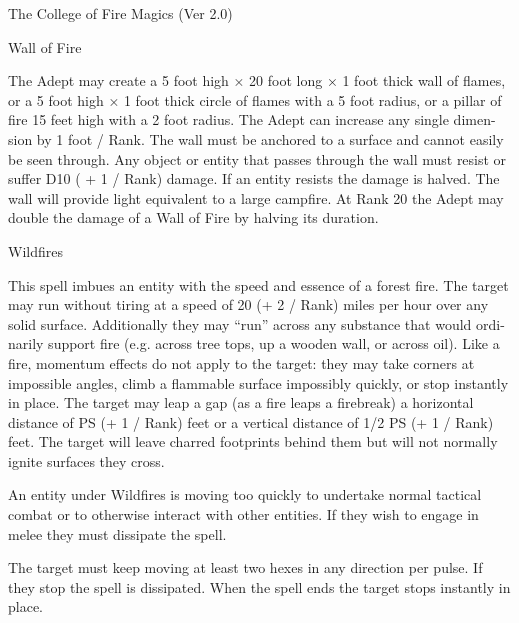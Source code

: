 \begin{Chapter}{The College of Fire Magics (Ver 2.0)}
\begin{spell}[S-13]{Wall of Fire }
\begin{effects}
 The  Adept  may  create  a  5  foot  high  ×  20 
foot long × 1 foot thick wall of flames, or a 5 foot 
high  ×  1  foot  thick  circle  of  flames  with  a  5  foot 
radius, or a pillar of fire 15 feet high with a 2 foot 
radius.  The  Adept  can  increase  any  single  dimen-
sion by  1  foot  /  Rank.  The  wall  must  be  anchored 
to a surface and cannot easily be seen through. Any 
object  or  entity  that  passes  through  the  wall  must 
resist  or  suffer  D10  (  +  1  /  Rank)  damage.  If  an 
entity  resists  the  damage  is  halved.  The  wall  will 
provide  light  equivalent  to  a  large  campfire.  At 
Rank  20  the  Adept  may  double  the  damage  of  a 
Wall of Fire by halving its duration. 

\end{effects}
\end{spell}

\begin{spell}[S-14]{Wildfires }

\begin{effects}
This spell imbues an entity with the speed 
and  essence  of  a  forest  fire.  The  target  may  run 
without  tiring  at  a  speed  of  20  (+  2  /  Rank)  miles 
per  hour  over  any  solid  surface.  Additionally  they 
may  “run”  across  any  substance  that  would  ordi-
narily  support  fire  (e.g.  across  tree  tops,  up  a 
wooden wall, or across oil). Like a fire, momentum 
effects  do  not  apply  to  the  target:  they  may  take 
corners  at  impossible  angles,  climb  a  flammable 
surface  impossibly  quickly,  or  stop  instantly  in 
place. The target may  leap a gap (as a fire  leaps a 
firebreak) a horizontal distance of PS (+ 1 / Rank) 
feet  or  a  vertical  distance  of  1/2  PS  (+  1  /  Rank) 
feet. The target will leave charred footprints behind 
them  but  will  not  normally  ignite  surfaces  they 
cross. 

An entity under Wildfires is moving too quickly to 
undertake  normal  tactical  combat  or  to  otherwise 
interact  with  other  entities.  If  they  wish  to  engage 
in melee they must dissipate the spell. 

The target must keep moving at least two hexes in 
any  direction  per  pulse.  If  they  stop  the  spell  is 
dissipated.  When  the  spell  ends  the  target  stops 
instantly in place. 


\end{effects}
\end{spell}
\end{Chapter}
